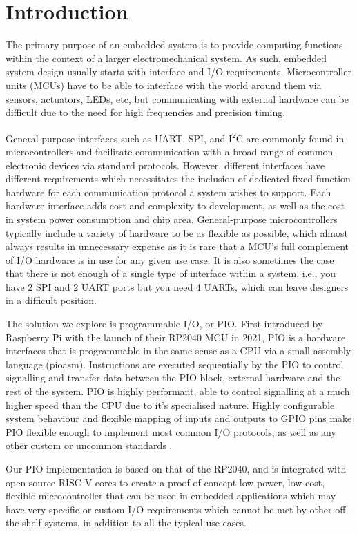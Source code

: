 \chapter{Introduction}
\label{ch:introduction}

The primary purpose of an embedded system is to provide computing functions within the context of a larger electromechanical system. As such, embedded system design usually starts with interface and I/O requirements. Microcontroller units (MCUs) have to be able to interface with the world around them via sensors, actuators, LEDs, etc, but communicating with external hardware can be difficult due to the need for high frequencies and precision timing.

General-purpose interfaces such as UART, SPI, and I\textsuperscript{2}C are commonly found in microcontrollers and facilitate communication with a broad range of common electronic devices via standard protocols. However, different interfaces have different requirements which necessitates the inclusion of dedicated fixed-function hardware for each communication protocol a system wishes to support. Each hardware interface adds cost and complexity to development, as well as the cost in system power consumption and chip area. General-purpose microcontrollers typically include a variety of hardware to be as flexible as possible, which almost always results in unnecessary expense as it is rare that a MCU's full complement of I/O hardware is in use for any given use case. It is also sometimes the case that there is not enough of a single type of interface within a system, i.e., you have 2 SPI and 2 UART ports but you need 4 UARTs, which can leave designers in a difficult position.

The solution we explore is programmable I/O, or PIO. First introduced by Raspberry Pi with the launch of their RP2040 MCU in 2021, PIO is a hardware interfaces that is programmable in the same sense as a CPU via a small assembly language (pioasm). Instructions are executed sequentially by the PIO to control signalling and transfer data between the PIO block, external hardware and the rest of the system. PIO is highly performant, able to control signalling at a much higher speed than the CPU due to it's specialised nature. Highly configurable system behaviour and flexible mapping of inputs and outputs to GPIO pins make PIO flexible enough to implement most common I/O protocols, as well as any other custom or uncommon standards \cite{rp2040}.

Our PIO implementation is based on that of the RP2040, and is integrated with open-source RISC-V cores to create a proof-of-concept low-power, low-cost, flexible microcontroller that can be used in embedded applications which may have very specific or custom I/O requirements which cannot be met by other off-the-shelf systems, in addition to all the typical use-cases.

